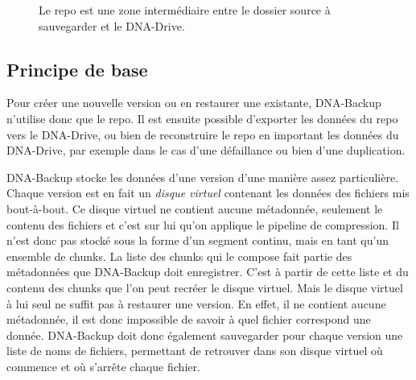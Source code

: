 \documentclass[a4paper]{report}
\begin{document}
\begin{figure*}[ht]
\centering


\caption{Le repo est une zone intermédiaire entre le dossier source à sauvegarder et le DNA-Drive.}
\label{fig:big-picture}
\end{figure*}

\subsection{Principe de base}

Pour créer une nouvelle version ou en restaurer une existante, DNA-Backup n'utilise donc que le repo.
Il est ensuite possible d'exporter les données du repo vers le DNA-Drive,
ou bien de reconstruire le repo en important les données du DNA-Drive,
par exemple dans le cas d'une défaillance ou bien d'une duplication.

DNA-Backup stocke les données d'une version d'une manière assez particulière.
Chaque version est en fait un \emph{disque virtuel} contenant les données des fichiers mis bout-à-bout.
Ce disque virtuel ne contient aucune métadonnée, seulement le contenu des fichiers
et c'est sur lui qu'on applique le pipeline de compression.
Il n'est donc pas stocké sous la forme d'un segment continu, mais en tant qu'un ensemble de chunks.
La liste des chunks qui le compose fait partie des métadonnées que DNA-Backup doit enregistrer.
C'est à partir de cette liste et du contenu des chunks que l'on peut recréer le disque virtuel.
Mais le disque virtuel à lui seul ne suffit pas à restaurer une version.
En effet, il ne contient aucune métadonnée,
il est donc impossible de savoir à quel fichier correspond une donnée.
DNA-Backup doit donc également sauvegarder pour chaque version une liste de noms de fichiers,
permettant de retrouver dans son disque virtuel où commence et où s'arrête chaque fichier.
\end{document}
